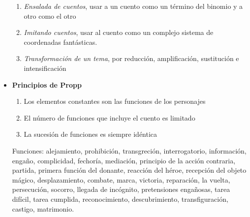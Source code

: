 \begin{itemize}
{\begin{enumerate}
			\item {\it Ensalada de cuentos}, usar a un cuento como un término del binomio y a otro como el otro
			\item {\it Imitando cuentos}, usar al cuento como un complejo sistema de coordenadas fantásticas.
			\item {\it Transformación de un tema}, por reducción, amplificación, sustitución e intensificación
		\end{enumerate}}
	\item {{\bf Principios de Propp}
		\begin{enumerate}
			\item Los elementos constantes son las funciones de los personajes
			\item El número de funciones que incluye el cuento es limitado
			\item La sucesión de funciones es siempre idéntica
		\end{enumerate}
		Funciones: alejamiento, prohibición, transgreción, interrogatorio, información, engaño, complicidad, fechoría, mediación, principio de la acción contraria, partida, primera función del donante, reacción del héroe, recepción del objeto mágico, desplazamiento, combate, marca, victoria, reparación, la vuelta, persecución, socorro, llegada de incógnito, pretensiones engañosas, tarea difícil, tarea cumplida, reconocimiento, descubrimiento, transfiguración, castigo, matrimonio.}
\end{itemize}
